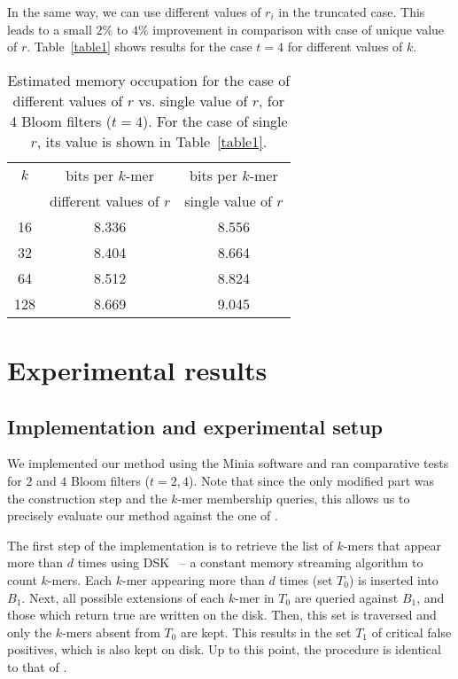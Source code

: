 \documentclass[pdftex]{llncs}\usepackage[T1]{fontenc}
\begin{document}
In the same way, we can use different values of $r_i$ in the truncated
case. This leads to a small $2\%$ to $4\%$ improvement in
comparison with case of unique value of $r$. 
Table~\ref{table1} shows results for the case $t=4$ for different values of $k$.

\begin{table}[h]
\begin{center}
\begin{tabular}{|c|c|c|}
\hline
$k$ & bits per $k$-mer & bits per $k$-mer \\
       &  different values of $r$ & single value of $r$ \\\hline\hline
16 & 8.336 &  8.556 \\
\hline
32 & 8.404 & 8.664\\
\hline
64 & 8.512 & 8.824\\
\hline
128 & 8.669 & 9.045\\
\hline
\end{tabular}
\end{center}
\label{table3}
\caption{Estimated memory occupation for the case of different values
  of $r$ vs. single value of $r$, for 4 Bloom filters ($t=4$). For the
  case of single $r$, its value is shown in Table~\ref{table1}. }
\end{table}

\section{Experimental results}
\subsection{Implementation and experimental setup} \label{sec:imple}
We implemented our method using the {\sc Minia} software 
\cite{DBLP:conf/wabi/ChikhiR12} and ran comparative tests for
$2$ and $4$ Bloom filters ($t = 2,4$). 
Note that since the only modified part was the construction step and
the $k$-mer membership queries, this allows us to precisely evaluate
our method against the one of \cite{DBLP:conf/wabi/ChikhiR12}. 

The first step of the implementation is to retrieve the list of $k$-mers
that appear more than $d$ times using
DSK~\cite{dsk} -- a constant memory streaming algorithm to count
$k$-mers.
Each $k$-mer appearing
more than $d$ times (set $T_0$) is inserted into $B_1$. Next, all possible extensions of each
$k$-mer in $T_0$ are queried against $B_1$, and those which return
true are written on the disk. 
Then, this set is traversed and only the $k$-mers absent from $T_0$ are
kept. This results in the set $T_1$ of critical false positives, which is also kept on
disk. Up to this point, the procedure is identical to that of
\cite{DBLP:conf/wabi/ChikhiR12}. 
\end{document}
